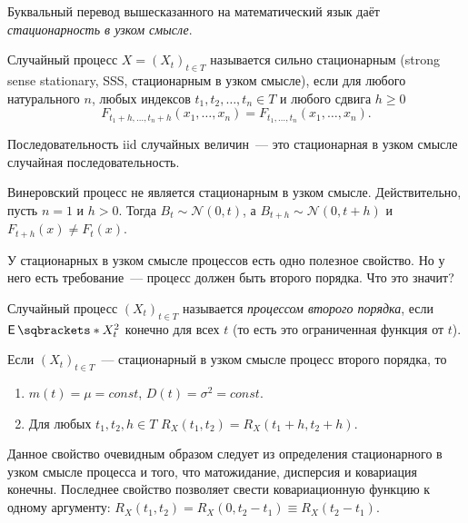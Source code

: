 Буквальный перевод вышесказанного на математический язык даёт 
\emph{стационарность в узком смысле}.
\begin{definition}
	Случайный процесс \(X = (X_{t})_{t \in T}\) называется сильно стационарным 
	(strong sense stationary, SSS, стационарным в узком смысле), если для 
	любого натурального \(n\), любых индексов \(t_{1}, t_{2}, \ldots, t_{n} \in 
	T\) и любого сдвига \(h \geq 0\)
	\[
		F_{t_{1} + h, \ldots, t_{n} + h}(x_{1}, \dots, x_{n}) = F_{t_{1}, 
		\ldots, t_{n}}(x_{1}, \dots, x_{n}).
	\]
\end{definition}
\begin{example}
	Последовательность iid случайных величин~--- это стационарная в узком 
	смысле случайная последовательность.
\end{example}
\begin{example}
	Винеровский процесс не является стационарным в узком смысле. Действительно, 
	пусть \(n = 1\) и \(h > 0\). Тогда \(B_{t} \sim \mathcal{N}(0, t)\), а 
	\(B_{t + h} \sim \mathcal{N}(0, t + h)\) и \(F_{t + h}(x) \neq F_{t}(x)\).
\end{example}
У стационарных в узком смысле процессов есть одно полезное свойство. Но у него 
есть требование~--- процесс должен быть второго порядка. Что это значит?
\begin{definition}
	Случайный процесс \((X_{t})_{t \in T}\) называется \emph{процессом второго 
	порядка}, если \(\E{X_{t}^{2}}\) конечно для всех \(t\) (то есть это 
	ограниченная функция от \(t\)).
\end{definition}
\begin{property}
	Если \((X_{t})_{t \in T}\)~--- стационарный в узком смысле процесс второго 
	порядка, то
	\begin{enumerate}
		\item \(m(t) = \mu = const\), \(D(t) = \sigma^{2} = const\).
		\item Для любых \(t_{1}, t_{2}, h \in T\) \(R_{X}(t_{1}, t_{2}) = 
		R_{X}(t_{1} + h, t_{2} + h)\).
	\end{enumerate}
\end{property}
Данное свойство очевидным образом следует из определения стационарного в узком 
смысле процесса и того, что матожидание, дисперсия и ковариация конечны. 
Последнее свойство позволяет свести ковариационную функцию к одному аргументу: 
\(R_{X}(t_{1}, t_{2}) = R_{X}(0, t_{2} - t_{1}) \equiv R_{X}(t_{2} - t_{1})\).

